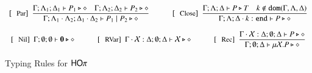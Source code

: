 \begin{figure}[!t]
\[\begin{array}{c}
		\trule{Par}~~\tree{
			\Gamma; \Lambda_{1}; \Delta_{1} \proves P_{1} \hastype \Proc \quad \Gamma; \Lambda_{2}; \Delta_{2} \proves P_{2} \hastype \Proc
		}{
			\Gamma; \Lambda_{1} \cat \Lambda_2; \Delta_{1} \cat \Delta_2 \proves P_1 \Par P_2 \hastype \Proc
		}
		\qquad\quad
		\trule{Close}~~\tree{
			\Gamma; \Lambda; \Delta  \proves P \hastype T \quad k \not\in \dom{\Gamma, \Lambda,\Delta}
		}{
			\Gamma; \Lambda; \Delta \cat k: \tinact  \proves P \hastype \Proc
		}
		\\[6mm]

		\trule{Nil}~~\Gamma; \emptyset; \emptyset \proves \inact \hastype \Proc
		\qquad \quad
		\trule{RVar}~~\Gamma \cat \rvar{X}: \Delta; \emptyset; \Delta  \proves \rvar{X} \hastype \Proc
		\qquad\quad 

	 	\trule{Rec}~~\tree{
			\Gamma \cat \rvar{X}: \Delta; \emptyset; \Delta  \proves P \hastype \Proc
		}{
			\Gamma ; \emptyset; \Delta  \proves \recp{X}{P} \hastype \Proc
		}


%
%
%
	\end{array}
\]
\caption{Typing Rules for $\mathsf{HO}\pi$\label{fig:typerulesmy}}
\end{figure}
